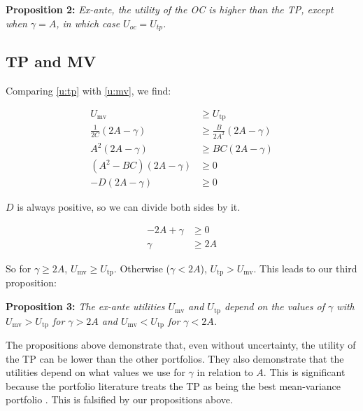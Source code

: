 \documentclass[12pt,oneside,a4paper]{memoir}
\begin{document}
\vspace{18pt}
\noindent
\textbf{Proposition 2:}
\textit{Ex-ante, the utility of the OC is higher than the TP, except when $\gamma = A$, in which case $U_{oc}=U_{tp}$.}

\subsection*{TP and MV}
Comparing \eqref{u:tp} with \eqref{u:mv}, we find:

\vspace{-18 pt}
\begin{align*}
U_{\mathrm{mv}} & \geq U_{\mathrm{tp}}
\\
\frac{1}{2C} (2A- \gamma) & \geq \frac{B}{2A^2} (2A - \gamma) 
\\
A^2(2A- \gamma) & \geq BC (2A - \gamma)
\\
(A^2-BC)(2A- \gamma) & \geq 0
\\
-D(2A- \gamma) & \geq 0
\end{align*}

\noindent 
$D$ is always positive, so we can divide both sides by it.

\vspace{-18 pt}
\begin{align*}
-2A + \gamma & \geq 0
\\
\gamma & \geq 2A
\end{align*}

So for $\gamma \geq 2A$, $U_{\mathrm{mv}} \geq U_{\mathrm{tp}}$.
Otherwise ($\gamma < 2A$), $U_{\mathrm{tp}} > U_{\mathrm{mv}}$.
This leads to our third proposition:

\vspace{18pt}
\noindent
\textbf{Proposition 3:}
\textit{The ex-ante utilities $U_{\mathrm{mv}}$ and $U_{\mathrm{tp}}$ depend on the values of $\gamma$ with
$U_{\mathrm{mv}} > U_{\mathrm{tp}}$ for $\gamma > 2A$ and 
$U_{\mathrm{mv}} < U_{\mathrm{tp}}$ for $\gamma < 2A$.}
\vspace{18pt}

% 
The propositions above demonstrate that, even without uncertainty, the utility of the TP can be lower than the other portfolios. They also demonstrate that the utilities depend on what values we use for $\gamma$ in relation to $A$. This is significant because the portfolio literature treats the TP as being the best mean-variance portfolio \cite{memmel-2006, jones-1999, dgu2009}. This is falsified by our propositions above.
\end{document}
